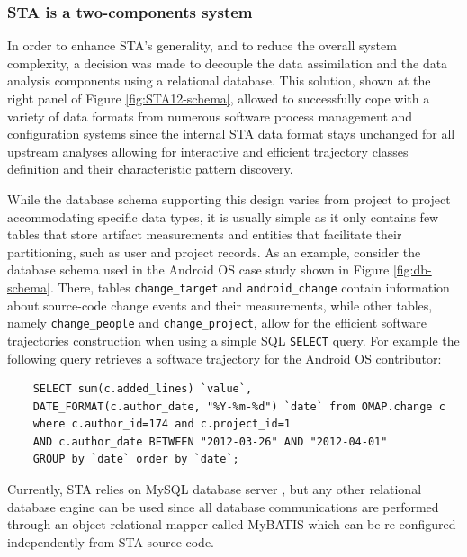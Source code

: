 \subsubsection{STA is a two-components system}\label{two_components}
In order to enhance STA's generality, and to reduce the overall system complexity, a decision was made to decouple the data assimilation and the data analysis components using a relational database. This solution, shown at the right panel of Figure \ref{fig:STA12-schema}, allowed to successfully cope with a variety of data formats from numerous software process management and configuration systems since the internal STA data format stays unchanged for all upstream analyses allowing for interactive and efficient trajectory classes definition and their characteristic pattern discovery. 

While the database schema supporting this design varies from project to project accommodating specific data types, it is usually simple as it only contains few tables that store artifact measurements and entities that facilitate their partitioning, such as user and project records. As an example, consider the database schema used in the Android OS case study shown in Figure \ref{fig:db-schema}. There, tables \texttt{change\_target} and \texttt{android\_change} contain information about source-code change events and their measurements, while other tables, namely \texttt{change\_people} and \texttt{change\_project}, allow for the efficient software trajectories construction when using a simple SQL \texttt{SELECT} query. For example the following query retrieves a software trajectory for the Android OS contributor: 
\begin{verbatim}
    SELECT sum(c.added_lines) `value`, 
    DATE_FORMAT(c.author_date, "%Y-%m-%d") `date` from OMAP.change c
    where c.author_id=174 and c.project_id=1
    AND c.author_date BETWEEN "2012-03-26" AND "2012-04-01"
    GROUP by `date` order by `date`;
\end{verbatim}

Currently, STA relies on MySQL database server \cite{mysql}, but any other relational database engine can be used since all database communications are performed through an object-relational mapper called MyBATIS \cite{mybatis} which can be re-configured independently from STA source code.

